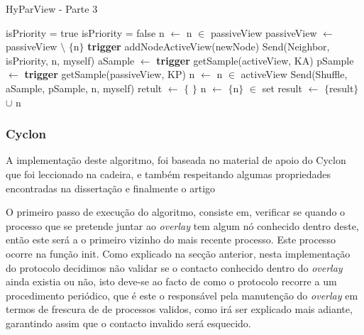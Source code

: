\begin{algorithm}
   \caption{HyParView - Parte 3}
    \begin{algorithmic}[1]
    
                \State isPriority = true
            \Else
                \State isPriority = false
            \EndIf
            \State n $\leftarrow$ n $\in$ passiveView
            \State passiveView $\leftarrow$ passiveView $\setminus$ $\{$n$\}$
            \State \textbf{trigger} addNodeActiveView(newNode)
            \State Send(Neighbor, isPriority, n, myself)
        \EndIf
     \EndFunction
     \State
            \State aSample $\leftarrow$ \textbf{trigger} getSample(activeView, KA)
            \State pSample $\leftarrow$ \textbf{trigger} getSample(passiveView, KP)
            \State n $\leftarrow$ n $\in$ activeView
            \State Send(Shuffle, aSample, pSample, n, myself)
        \EndIf
     \EndFunction
     \State
        \State retult $\leftarrow$ $\{$ $\}$
            \State n $\leftarrow$ $\{$n$\}$ $\in$ set
            \State result $\leftarrow$ $\{$result$\}$ $\cup$ n
        \EndFor
     \EndFunction
    
\end{algorithmic}
\end{algorithm}


\subsubsection{Cyclon}

A implementação deste algoritmo, foi baseada no material de apoio do Cyclon que foi leccionado na cadeira, e também respeitando algumas propriedades encontradas na dissertação \cite{leitao} e finalmente o artigo \cite{cyclon}

O primeiro passo de execução do algoritmo, consiste em, verificar se quando o processo que se pretende juntar ao \textit{overlay} tem algum nó conhecido dentro deste, então este será a o primeiro vizinho do mais recente processo. Este processo ocorre na função init. Como explicado na secção anterior, nesta implementação do protocolo decidimos não validar se o contacto conhecido dentro do \textit{overlay} ainda existia ou não, isto deve-se ao facto de como o protocolo recorre a um procedimento periódico, que é este o responsável pela manutenção do \textit{overlay} em termos de frescura de de processos validos, como irá ser explicado mais adiante, garantindo assim que o contacto invalido será esquecido.

